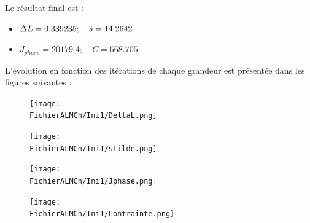 \documentclass[11pt,a4paper]{article}
\begin{document}
Le résultat final est :
\begin{itemize}
	\item $\Delta L= 0.339235;\quad \tilde{s}=14.2642 $
	\item $J_{phase}=20179.4;\quad C= 668.705$
\end{itemize}

L'évolution en fonction des itérations de chaque grandeur est présentée dans les figures suivantes :

\begin{figure}[H]
	\begin{minipage}{0.45\textwidth}
		\centering
		\texttt{[image: \\FichierALMCh/Ini1/DeltaL.png]}
	\end{minipage}
	\begin{minipage}{0.45\textwidth}
		\centering
		\texttt{[image: \\FichierALMCh/Ini1/stilde.png]}
	\end{minipage}	
\end{figure}

\begin{figure}[H]
	\begin{minipage}{0.45\textwidth}
		\centering
		\texttt{[image: \\FichierALMCh/Ini1/Jphase.png]}
	\end{minipage}
	\begin{minipage}{0.45\textwidth}
		\centering
		\texttt{[image: \\FichierALMCh/Ini1/Contrainte.png]}
	\end{minipage}	
\end{figure}

\setcounter{x}{0}
\end{document}

